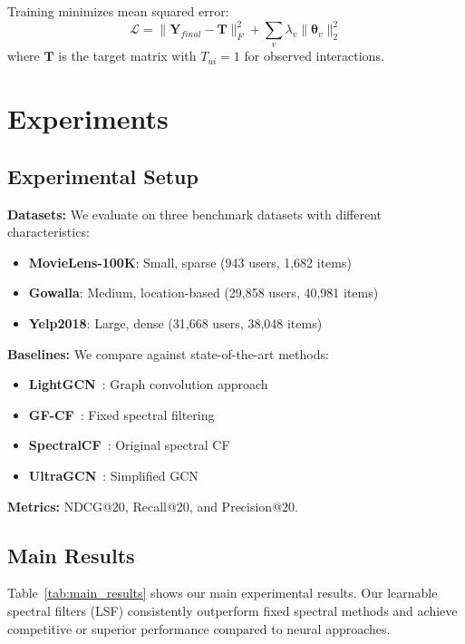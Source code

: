 \documentclass[10pt,twocolumn,letterpaper]{article}
\begin{document}
Training minimizes mean squared error:
\begin{equation}
\mathcal{L} = \|\mathbf{Y}_{final} - \mathbf{T}\|_F^2 + \sum_{v} \lambda_v \|\boldsymbol{\theta}_v\|_2^2
\end{equation}
where $\mathbf{T}$ is the target matrix with $T_{ui} = 1$ for observed interactions.

\section{Experiments}

\subsection{Experimental Setup}

\textbf{Datasets:} We evaluate on three benchmark datasets with different characteristics:
\begin{itemize}
    \item \textbf{MovieLens-100K}: Small, sparse (943 users, 1,682 items)
    \item \textbf{Gowalla}: Medium, location-based (29,858 users, 40,981 items)  
    \item \textbf{Yelp2018}: Large, dense (31,668 users, 38,048 items)
\end{itemize}

\textbf{Baselines:} We compare against state-of-the-art methods:
\begin{itemize}
    \item \textbf{LightGCN}~\cite{he2020lightgcn}: Graph convolution approach
    \item \textbf{GF-CF}~\cite{liu2021gfcf}: Fixed spectral filtering
    \item \textbf{SpectralCF}~\cite{zheng2020spectral}: Original spectral CF
    \item \textbf{UltraGCN}~\cite{mao2021ultragcn}: Simplified GCN
\end{itemize}

\textbf{Metrics:} NDCG@20, Recall@20, and Precision@20.

\subsection{Main Results}

Table~\ref{tab:main_results} shows our main experimental results. Our learnable spectral filters (LSF) consistently outperform fixed spectral methods and achieve competitive or superior performance compared to neural approaches.
\end{document}
